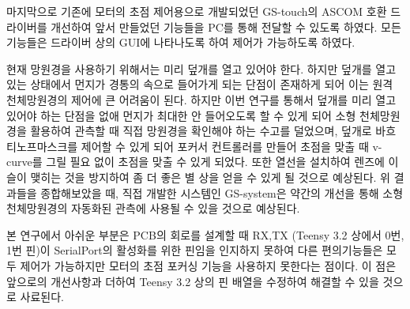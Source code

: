 마지막으로 기존에 모터의 초점 제어용으로 개발되었던 GS-touch의 ASCOM 호환 드라이버를 개선하여 앞서 만들었던 기능들을 PC를 통해 전달할 수 있도록 하였다. 모든 기능들은 드라이버 상의 GUI에 나타나도록 하여 제어가 가능하도록 하였다.

현재 망원경을 사용하기 위해서는 미리 덮개를 열고 있어야 한다. 하지만 덮개를 열고 있는 상태에서 먼지가 경통의 속으로 들어가게 되는 단점이 존재하게 되어 이는 원격 천체망원경의 제어에 큰 어려움이 된다. 하지만 이번 연구를 통해서 덮개를 미리 열고 있어야 하는 단점을 없애 먼지가 최대한 안 들어오도록 할 수 있게 되어 소형 천체망원경을 활용하여 관측할 때 직접 망원경을 확인해야 하는 수고를 덜었으며, 덮개로 바흐티노프마스크를 제어할 수 있게 되어 포커서 컨트롤러를 만들어 초점을 맞출 때 v-curve를 그릴 필요 없이 초점을 맞출 수 있게 되었다. 또한 열선을 설치하여 렌즈에 이슬이 맺히는 것을 방지하여 좀 더 좋은 별 상을 얻을 수 있게 될 것으로 예상된다. 위 결과들을 종합해보았을 때, 직접 개발한 시스템인 GS-system은 약간의 개선을 통해 소형 천체망원경의 자동화된 관측에 사용될 수 있을 것으로 예상된다.


본 연구에서 아쉬운 부분은 PCB의 회로를 설계할 때 RX,TX (Teensy 3.2 상에서 0번, 1번 핀)이 SerialPort의 활성화를 위한 핀임을 인지하지 못하여 다른 편의기능들은 모두 제어가 가능하지만 모터의 초점 포커싱 기능을 사용하지 못한다는 점이다. 이 점은 앞으로의 개선사항과 더하여 Teensy 3.2 상의 핀 배열을 수정하여 해결할 수 있을 것으로 사료된다.